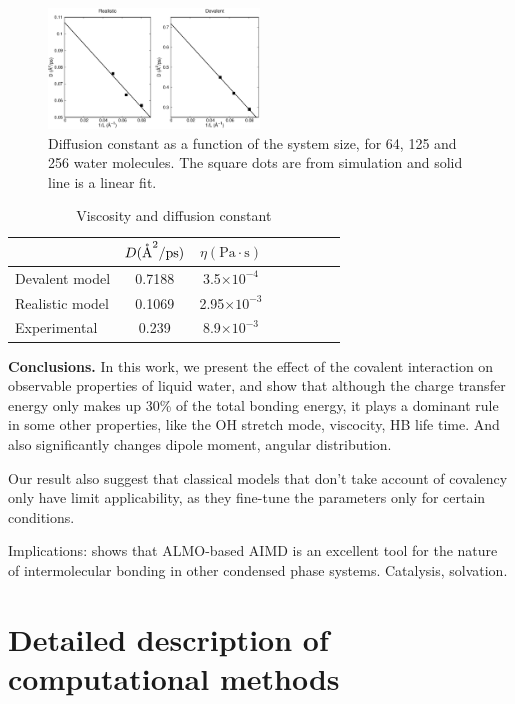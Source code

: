 \documentclass[aps,prl,reprint,amsmath,amssymb]{revtex4-1}
\begin{document}
\begin{figure}
\includegraphics[width=0.5\textwidth]{msd}
\caption{Diffusion constant as a function of the system size, for 64, 125 and 256 water molecules. 
The square dots are from simulation and solid line is a linear fit.}\label{Fig:dfs}
\end{figure} 

\begin{table}
\caption{Viscosity and diffusion constant}\label{Tab:dfs}
\begin{tabular}{l*{6}{c}r}
\hline
               & $D(\mathring{\text{A}}^2/\text{ps})$ & $\eta(\text{Pa}\cdot \text{s})$ \\
\hline
Devalent model                & 0.7188 & 3.5$\times 10^{-4}$ \\

Realistic model              & 0.1069 & 2.95$\times 10^{-3}$\\

Experimental            & 0.239  & 8.9$\times 10^{-3} $
\end{tabular}
\end{table}
 
\textbf{Conclusions.} In this work, we present the effect of the covalent interaction on observable properties of liquid water, and show that although the charge transfer energy only makes up 30\% of the total bonding energy, it plays a dominant rule in some other properties, like the OH stretch mode, viscocity, HB life time. 
And also significantly changes dipole moment, angular distribution.
 
Our result also suggest that classical models that don't take account of covalency only have limit applicability, as they fine-tune the parameters only for certain conditions.
 
Implications: shows that ALMO-based AIMD is an excellent tool for the nature of intermolecular bonding in other condensed phase systems. 
Catalysis, solvation.

\section{Detailed description of computational methods}
\end{document}
